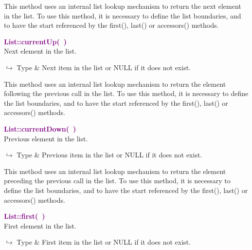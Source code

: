 This method uses an internal list lookup mechanism to return the next element in the list.
To use this method, it is necessary to define the list boundaries, and to have the start referenced by the first(), last() or accessors() methods.

\textcolor{purple}{\textbf{List::currentUp(~)}}\label{List::currentUp()}\\
Next element in the list.\vspace*{-0.5em}
\begin{tcolorbox}[grow to left by=-1cm, width=\textwidth-1cm,myArgs,tabularx={l|R}]
$\hookrightarrow$ Type & Next item in the list or NULL if it does not exist.
\end{tcolorbox}

This method uses an internal list lookup mechanism to return the element following the previous call in the list.
To use this method, it is necessary to define the list boundaries, and to have the start referenced by the first(), last() or accessors() methods.

\textcolor{purple}{\textbf{List::currentDown(~)}}\label{List::currentDown()}\\
Previous element in the list.\vspace*{-0.5em}
\begin{tcolorbox}[grow to left by=-1cm, width=\textwidth-1cm,myArgs,tabularx={l|R}]
$\hookrightarrow$ Type & Previous item in the list or NULL if it does not exist.
\end{tcolorbox}

This method uses an internal list lookup mechanism to return the element preceding the previous call in the list.
To use this method, it is necessary to define the list boundaries, and to have the start referenced by the first(), last() or accessors() methods.

\textcolor{purple}{\textbf{List::first(~)}}\label{List::first()}\\
First element in the list.\vspace*{-0.5em}
\begin{tcolorbox}[grow to left by=-1cm, width=\textwidth-1cm,myArgs,tabularx={l|R}]
$\hookrightarrow$ Type & First item in the list or NULL if it does not exist.
\end{tcolorbox}

